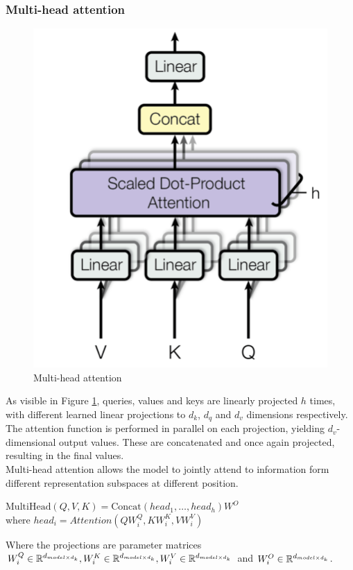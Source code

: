 \documentclass[\main/main.tex]{subfiles}
\begin{document}
\subsubsection{Multi-head attention}
\begin{figure}[H]
    \centering
    \includegraphics[scale=0.25]{images/transformer/multi-headed_attention.jpeg}
    \caption{Multi-head attention}
    \label{fig:multi-head_attention}
\end{figure}
As visible in Figure \ref{fig:multi-head_attention}, queries, values and keys are linearly projected $h$ times, with different learned linear projections to $d_k$, $d_q$ and $d_v$ dimensions respectively. The attention function is performed in parallel on each projection, yielding $d_v$-dimensional output values. These are concatenated and once again projected, resulting in the final values. \\
Multi-head attention allows the model to jointly attend to information form different representation subspaces at different position. 
\begin{center}
    $\mathrm{MultiHead}(Q, V, K) =\mathrm{Concat}(head_1, \dots, head_h)W^O$\\
    where $head_i = Attention(QW^Q_i, KW^K_i, VW^V_i)$
\end{center}
Where the projections are parameter matrices $W^Q_i\in\mathbb{R}^{d_{model \times d_k}}, W^K_i\in\mathbb{R}^{d_{model \times d_k}}, W^V_i\in\mathbb{R}^{d_{model \times d_k}}$ and $ W^O_i\in\mathbb{R}^{d_{model \times d_k}}$.
\end{document}
